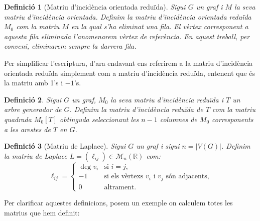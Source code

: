 \documentclass{article}
\newtheorem{definition}{Definició}[section]
\begin{document}
\begin{definition}[Matriu d'incidència orientada reduïda]
    Sigui $G$ un graf i $M$ la seva matriu d'incidència orientada. Definim la matriu d'incidència orientada reduïda $M_0$ com la matriu $M$ en la qual s'ha eliminat una fila. El vèrtex corresponent a aquesta fila eliminada l'anomenarem vèrtex de referència. En aquest treball, per conveni, eliminarem sempre la darrera fila. \cite{2}
\end{definition}
Per simplificar l'escriptura, d'ara endavant ens referirem a la matriu d'incidència orientada reduïda simplement com a matriu d'incidència reduïda, entenent que és la matriu amb 1's i $-1$'s.
\begin{definition}
    Sigui $G$ un graf, $M_0$ la seva matriu d'incidència reduïda i $T$ un arbre generador de $G$. Definim la matriu d'incidència reduïda de $T$ com la matriu quadrada $M_0[T]$ obtinguda seleccionant les $n-1$ columnes de $M_0$ corresponents a les arestes de $T$ en $G$. \cite{2}
\end{definition}
\begin{definition}[Matriu de Laplace]
    Sigui $G$ un graf i sigui $n=|V(G)|$. Definim la matriu de Laplace $L=(\ell_{ij})\in\mathcal{M}_n(\mathbb{R})$ com:
    $$\ell_{ij}=\left\{\begin{array}{cl}
            \deg v_i & \text{si $i=j$,}                                   \\
            -1       & \text{si els vèrtexs $v_i$ i $v_j$ són adjacents,} \\
            0        & \text{altrament.}
        \end{array}\right.$$\cite{9}
\end{definition}
Per clarificar aquestes definicions, posem un exemple on calculem totes les matrius que hem definit:
\end{document}
